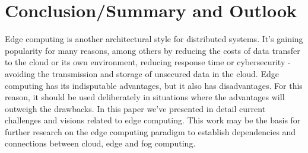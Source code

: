 \section{Conclusion/Summary and Outlook}\label{sec:conclusions}

Edge computing is another architectural style for distributed systems. It's gaining popularity for many reasons, among others by reducing the costs of data transfer to the cloud or its own environment, reducing response time or cybersecurity - avoiding the transmission and storage of unsecured data in the cloud. Edge computing has its indisputable advantages, but it also has disadvantages. For this reason, it should be used deliberately in situations where the advantages will outweigh the drawbacks. In this paper we've presented in detail current challenges and visions related to edge computing. This work may be the basis for further research on the edge computing paradigm to establish dependencies and connections between cloud, edge and fog computing.